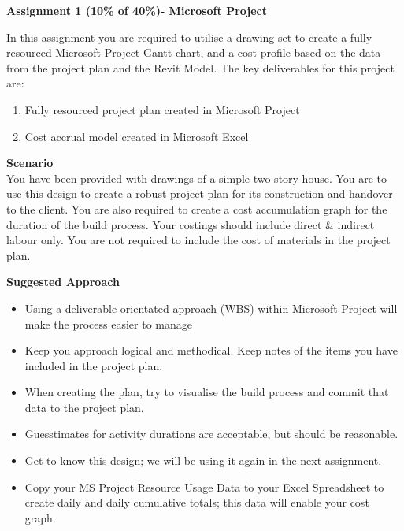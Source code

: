 
	
\begin{flushleft}
\Large\textbf{Assignment 1 (10\% of 40\%)- Microsoft Project}\\
\end{flushleft}

In this assignment you are required to utilise a drawing set to create a fully resourced Microsoft Project Gantt chart, and a cost profile based on the data from the project plan and the Revit Model.  The key deliverables for this project are:

\begin{enumerate}
	\item Fully resourced project plan created in Microsoft Project
	\item Cost accrual model created in Microsoft Excel
\end{enumerate}

\textbf{Scenario}\\


You have been provided with drawings of a simple two story house.  You are to use this design to create a robust project plan for its construction and handover to the client.  You are also required to create a cost accumulation graph for the duration of the build process.  Your costings should include direct \& indirect labour only.  You are not required to include the cost of materials in the project plan.


\vspace{.5cm}

\textbf{Suggested Approach}

\begin{itemize}
	\item Using a deliverable orientated approach (WBS) within Microsoft Project will make the process easier to manage
	\item Keep you approach logical and methodical.  Keep notes of the items you have included in the project plan.
	\item When creating the plan, try to visualise the build process and commit that data to the project plan.
	\item Guesstimates for activity durations are acceptable, but should be reasonable.
	\item Get to know this design; we will be using it again in the next assignment.
	\item Copy your MS Project Resource Usage Data to your Excel Spreadsheet to create daily and daily cumulative totals; this data will enable your cost graph.
\end{itemize}


